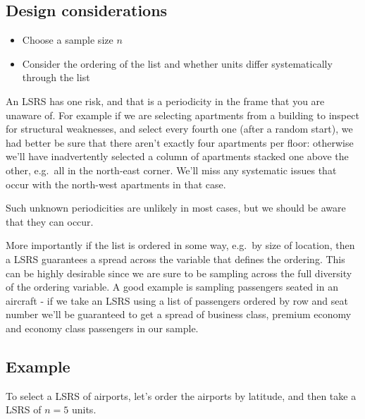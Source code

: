 \documentclass[
]{book}
\newenvironment{Shaded}{\begin{snugshade}}{\end{snugshade}}
\newcommand{\DecValTok}[1]{\textcolor[rgb]{0.00,0.00,0.81}{#1}}
\newcommand{\FunctionTok}[1]{\textcolor[rgb]{0.13,0.29,0.53}{\textbf{#1}}}
\newcommand{\NormalTok}[1]{#1}
\newcommand{\OtherTok}[1]{\textcolor[rgb]{0.56,0.35,0.01}{#1}}
\newcommand{\SpecialCharTok}[1]{\textcolor[rgb]{0.81,0.36,0.00}{\textbf{#1}}}
\newcommand{\StringTok}[1]{\textcolor[rgb]{0.31,0.60,0.02}{#1}}
\providecommand{\tightlist}{%
  \setlength{\itemsep}{0pt}\setlength{\parskip}{0pt}}
\begin{document}
\subsection*{Design considerations}\label{design-considerations-4}

\begin{itemize}
\tightlist
\item
  Choose a sample size \(n\)
\item
  Consider the ordering of the list and whether units differ systematically
  through the list
\end{itemize}

An LSRS has one risk, and that is a periodicity in the frame that you
are unaware of. For example if we are selecting apartments from a building to
inspect for structural weaknesses, and select every fourth one (after a random start),
we had better be sure that there aren't exactly four apartments per floor:
otherwise we'll have inadvertently selected a column of apartments stacked one
above the other, e.g.~all in the north-east corner. We'll miss any
systematic issues that occur with the north-west apartments in that case.

Such unknown periodicities are unlikely in most cases, but we should be aware
that they can occur.

More importantly if the list is ordered in some way, e.g.~by size of location,
then a LSRS guarantees a spread across the variable that defines the ordering.
This can be highly desirable since we are sure to be sampling across the full
diversity of the ordering variable. A good example is sampling passengers seated
in an aircraft - if we take an LSRS using a list of passengers ordered by row and
seat number we'll be guaranteed to get a spread of business class, premium economy and
economy class passengers in our sample.

\subsection*{Example}\label{example-4}

To select a LSRS of airports, let's order the airports by latitude, and then
take a LSRS of \(n=5\) units.

\begin{Shaded}
\end{Shaded}
\end{document}
